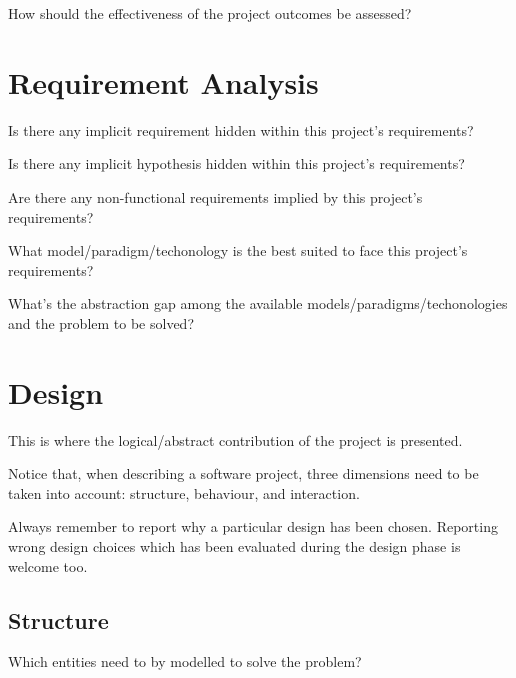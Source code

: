 \documentclass[12pt,a4paper,oneside,article]{article}
\begin{document}
			How should the effectiveness of the project outcomes be assessed?
	
	\section{Requirement Analysis}
		Is there any implicit requirement hidden within this project's requirements?
		
		Is there any implicit hypothesis hidden within this project's requirements?
		
		Are there any non-functional requirements implied by this project's requirements?
		
		What model/paradigm/techonology is the best suited to face this project's requirements?
		
		What's the abstraction gap among the available models/paradigms/techonologies and the problem to be solved?
	
	\section{Design}
		This is where the logical/abstract contribution of the project is presented.
		
		Notice that, when describing a software project, three dimensions need to be taken into account: structure, behaviour, and interaction.
		
		Always remember to report why a particular design has been chosen. Reporting wrong design choices which has been evaluated during the design phase is welcome too.
		
		\subsection{Structure}
			Which entities need to by modelled to solve the problem?
			
			
\end{document}
